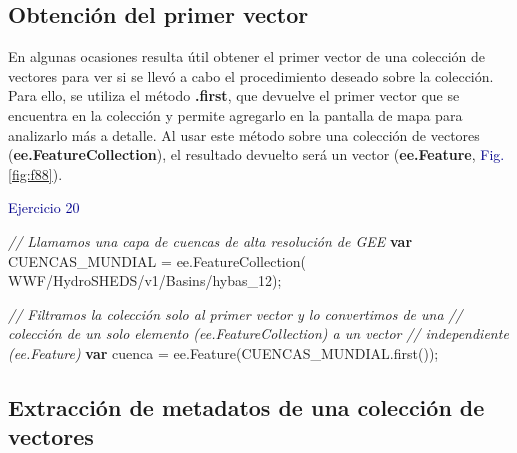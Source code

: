\documentclass[
  12pt,
  letterpaper,
  twoside]{book}
\newenvironment{Shaded}{\begin{snugshade}}{\end{snugshade}}
\newcommand{\CommentTok}[1]{\textcolor[rgb]{0.24,0.58,0.00}{\textit{#1}}}
\newcommand{\ControlFlowTok}[1]{\textcolor[rgb]{0.00,0.00,0.00}{\textbf{#1}}}
\newcommand{\FunctionTok}[1]{\textcolor[rgb]{0.48,0.12,0.64}{#1}}
\newcommand{\KeywordTok}[1]{\textcolor[rgb]{0.48,0.12,0.64}{#1}}
\newcommand{\NormalTok}[1]{#1}
\newcommand{\OperatorTok}[1]{\textcolor[rgb]{0.00,0.00,0.00}{#1}}
\newcommand{\StringTok}[1]{\textcolor[rgb]{0.87,0.29,0.22}{#1}}
\newcommand\boldpurple[1]{\textcolor{darkpurple}{\textbf{#1}}}
\begin{document}
\hypertarget{obtenciuxf3n-del-primer-vector}{%
\subsection*{Obtención del primer vector}\label{obtenciuxf3n-del-primer-vector}}

En algunas ocasiones resulta útil obtener el primer vector de una colección de vectores para ver si se llevó a cabo el procedimiento deseado sobre la colección. Para ello, se utiliza el método \boldpurple{.first}, que devuelve el primer vector que se encuentra en la colección y permite agregarlo en la pantalla de mapa para analizarlo más a detalle. Al usar este método sobre una colección de vectores (\boldpurple{ee.FeatureCollection}), el resultado devuelto será un vector (\boldpurple{ee.Feature}, \textcolor{darkblue}{Fig.} \ref{fig:f88}).

\textcolor{darkblue}{Ejercicio 20}

\begin{Shaded}
\begin{Highlighting}[]
\CommentTok{// Llamamos una capa de cuencas de alta resolución de GEE}
\ControlFlowTok{var}\NormalTok{ CUENCAS\_MUNDIAL }\OperatorTok{=} \KeywordTok{ee}\OperatorTok{.}\FunctionTok{FeatureCollection}\NormalTok{(}
  \StringTok{\textquotesingle{}WWF/HydroSHEDS/v1/Basins/hybas\_12\textquotesingle{}}\NormalTok{)}\OperatorTok{;}
 
\CommentTok{// Filtramos la colección solo al primer vector y lo convertimos de una}
\CommentTok{// colección de un solo elemento (ee.FeatureCollection) a un vector }
\CommentTok{// independiente (ee.Feature)}
\ControlFlowTok{var}\NormalTok{ cuenca }\OperatorTok{=} \KeywordTok{ee}\OperatorTok{.}\FunctionTok{Feature}\NormalTok{(CUENCAS\_MUNDIAL}\OperatorTok{.}\FunctionTok{first}\NormalTok{())}\OperatorTok{;} 
\end{Highlighting}
\end{Shaded}

\hypertarget{extracciuxf3n-de-metadatos-de-una-colecciuxf3n-de-vectores}{%
\subsection*{Extracción de metadatos de una colección de vectores}\label{extracciuxf3n-de-metadatos-de-una-colecciuxf3n-de-vectores}}
\end{document}
